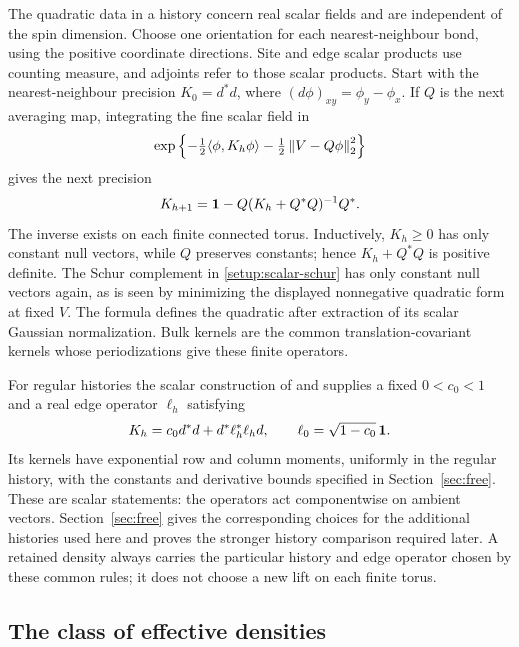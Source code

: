 The quadratic data in a history concern real scalar fields and are
independent of the spin dimension.  Choose one orientation for each nearest-neighbour bond, using the positive
coordinate directions.  Site and edge scalar products use counting measure,
and adjoints refer to those scalar products.  Start with the nearest-neighbour
precision \(K_0=d^*d\), where \((d\phi)_{xy}=\phi_y-\phi_x\).
If \(Q\) is the next averaging map, integrating the fine scalar field
in
\[
 \exp\left\{-\tfrac12\langle\phi,K_h\phi\rangle
                   -\tfrac12\left\lVert V-Q\phi\right\rVert_2^2\right\}
\]
gives the next precision
\begin{equation}
 K_{h+1}=\mathbf 1-Q(K_h+Q^*Q)^{-1}Q^*.
 \label{setup:scalar-schur}
\end{equation}
The inverse exists on each finite connected torus.  Inductively,
\(K_h\ge0\) has only constant null vectors, while \(Q\) preserves
constants; hence \(K_h+Q^*Q\) is positive definite.  The Schur complement
in \eqref{setup:scalar-schur} has only constant null vectors again, as is
seen by minimizing the displayed nonnegative quadratic form at fixed \(V\).  The formula defines the quadratic after extraction
of its scalar Gaussian normalization.  Bulk kernels are the common
translation-covariant kernels whose periodizations give these finite
operators.

For regular histories the scalar construction of 
and  supplies a fixed \(0<c_0<1\) and a real edge
operator \(\ell_h\) satisfying
\begin{equation}
 K_h=c_0d^*d+d^*\ell_h^*\ell_hd,
 \qquad \ell_0=\sqrt{1-c_0}\,\mathbf 1.
 \label{setup:edge-lift}
\end{equation}
Its kernels have exponential row and column moments, uniformly in the
regular history, with the constants and derivative bounds specified in
Section~\ref{sec:free}.  These are scalar statements: the operators act
componentwise on ambient vectors.  Section~\ref{sec:free} gives the
corresponding choices for the additional histories used here and proves
the stronger history comparison required later.  A retained density
always carries the particular history and edge operator chosen by these
common rules; it does not choose a new lift on each finite torus.

\subsection{The class of effective densities}
\label{subsec:setup-density}

